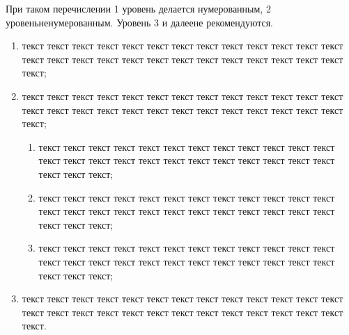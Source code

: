 При таком перечислении 1 уровень делается нумерованным, 2 уровень\mdash ненумерованным. Уровень 3 и далее\mdash не рекомендуются.

\begin{enumerate}
\item текст текст текст текст текст текст текст текст текст текст текст текст текст текст текст текст текст текст текст текст текст текст текст текст текст текст текст;
\item текст текст текст текст текст текст текст текст текст текст текст текст текст текст текст текст текст текст текст текст текст текст текст текст текст текст текст;	
\begin{enumerate}
	\item текст текст текст текст текст текст текст текст текст текст текст текст текст текст текст текст текст текст текст текст текст текст текст текст текст текст текст;
	\item текст текст текст текст текст текст текст текст текст текст текст текст текст текст текст текст текст текст текст текст текст текст текст текст текст текст текст;
	\item текст текст текст текст текст текст текст текст текст текст текст текст текст текст текст текст текст текст текст текст текст текст текст текст текст текст текст;
\end{enumerate}	
\item текст текст текст текст текст текст текст текст текст текст текст текст текст текст текст текст текст текст текст текст текст текст текст текст текст текст текст.
\end{enumerate}
